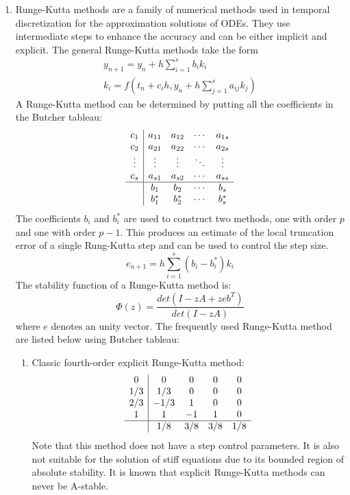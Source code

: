 \begin{enumerate}
\item Runge-Kutta methods are a family of numerical methods used in temporal discretization for the approximation solutions of ODEs. They use intermediate steps to enhance the accuracy and can be either implicit and explicit. The general Runge-Kutta methods take the form 
\begin{eqnarray}
y_{n+1} = y_n + h\sum_{i=1}^sb_ik_i\\
k_i = f(t_n+c_ih, y_n + h\sum_{j=1}^{s}a_{ij}k_j)
\end{eqnarray}
A Runge-Kutta method can be determined by putting all the coefficients in the Butcher tableau\cite{}:
\begin{equation}
\begin{array}{c|cccc}
c_1 & a_{11} & a_{12} & \cdots & a_{1s} \\
c_2 & a_{21} & a_{22} & \cdots & a_{2s} \\
\vdots & \vdots & \vdots & \ddots & \vdots\\
c_s & a_{s1} & a_{s2} & \cdots & a_{ss}\\
\hline
& b_1 & b_2 & \cdots & b_s\\
& b_1^* & b_2^* &\cdots & b_s^*
\end{array}
\end{equation}
The coefficients $b_i$ and $b_i^*$ are used to construct two methods, one with
order $p$ and one with order $p-1$. This produces an estimate of the local truncation 
error of a single Rung-Kutta step and can be used to control the step size.
\begin{equation}
e_{n+1} = h\sum_{i=1}^s(b_i-b_i^*)k_i
\end{equation}
The stability function of a Runge-Kutta method is:
\begin{equation}
\Phi(z) = \frac{det(I-zA+zeb^T)}{det(I-zA)}
\label{rk_stab_func}
\end{equation}
where $e$ denotes an unity vector.
The frequently used Runge-Kutta method are listed below using Butcher tableau:

\begin{enumerate}
\item Classic fourth-order explicit Runge-Kutta method:
\begin{equation}
\begin{array}{c|cccc}
0   & 0   & 0   & 0 & 0\\
1/3 & 1/3 & 0   & 0 & 0\\
2/3 & -1/3   & 1 & 0 & 0\\
1   & 1   & -1   & 1 & 0\\
\hline
& 1/8 & 3/8 & 3/8 & 1/8
\end{array}
\end{equation}
Note that this method does not have a step control parameters. It is also not suitable for the solution of stiff equations due to its bounded region of absolute stability. It is known that explicit Runge-Kutta methods can never be A-stable.


\end{enumerate}
\end{enumerate}
